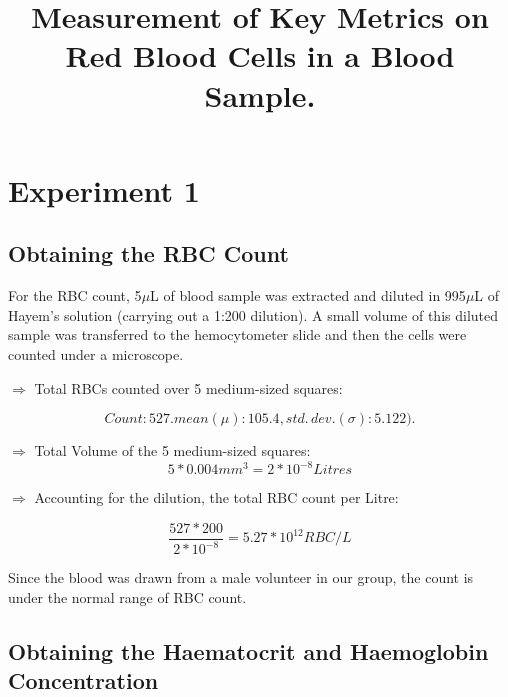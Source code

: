\documentclass[pdflatex,sn-mathphys]{sn-jnl}%
\theoremstyle{thmstyleone}%
\theoremstyle{thmstyletwo}%
\theoremstyle{thmstylethree}%
\begin{document}
\title[Red Blood Cell Lab]{Measurement of Key Metrics on Red Blood Cells in a Blood Sample.}

\author*[1,2]{ }





\maketitle

\section{Experiment 1}\label{sec1}
\subsection{Obtaining the RBC Count}
For the RBC count, 5$\mu$L of blood sample was extracted and diluted in 995$\mu$L of Hayem's solution (carrying out a 1:200 dilution). A small volume of this diluted sample was transferred to the hemocytometer slide and then the cells were counted under a microscope.\vspace{2mm}

$\Rightarrow$ Total RBCs counted over 5 medium-sized squares:

\[Count: 527. mean(\mu): 105.4, std. \, dev.(\sigma): 5.122). \]\vspace{0.3mm}

$\Rightarrow$ Total Volume of the 5 medium-sized squares:
\[5 * 0.004mm^{3} = 2 * 10^{-8} Litres\]

$\Rightarrow$ Accounting for the dilution, the total RBC count per Litre:

\[\frac{527 * 200}{2 * 10^{-8}} = 5.27 * 10^{12} RBC/L\]\vspace{0.3mm}

Since the blood was drawn from a male volunteer in our group, the count is under the normal range of RBC count.

\subsection{Obtaining the Haematocrit and Haemoglobin Concentration}
\end{document}
